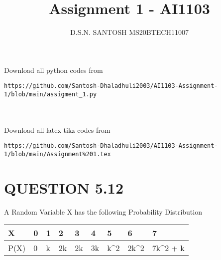 \documentclass[l1pt,a4paper,two column]{article}
\title{Assignment 1 - AI1103}
\author{D.S.N. SANTOSH MS20BTECH11007}
\date{}
\begin{document}
\maketitle

Download all python codes from 
\\
\begin{lstlisting}
https://github.com/Santosh-Dhaladhuli2003/AI1103-Assignment-1/blob/main/assigment_1.py
\end{lstlisting}
%
%
\\
\\
Download all latex-tikz codes from 
%
\\
\begin{lstlisting}
https://github.com/Santosh-Dhaladhuli2003/AI1103-Assignment-1/blob/main/Assignment%201.tex
\end{lstlisting}
   



\section{QUESTION 5.12}
A Random Variable X has the following Probability Distribution \\
\begin{table}[h]
\begin{tabular}{|l|l|l|l|l|l|l|l|l|}

\hline
X    & 0 & 1 & 2  & 3  & 4  & 5   & 6  & 7                     \\ \hline    
P(X) & 0 & k & 2k & 2k & 3k & k^2 & 2k^2 & 7k^2 + k \\ 
\hline

\end{tabular}
\end{table}
\end{document}
